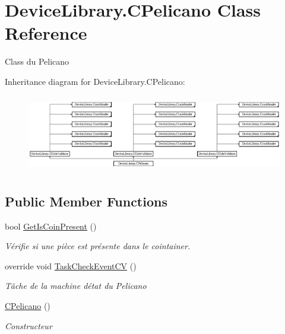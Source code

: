 \hypertarget{class_device_library_1_1_c_pelicano}{}\section{Device\+Library.\+C\+Pelicano Class Reference}
\label{class_device_library_1_1_c_pelicano}


Class du Pelicano  


Inheritance diagram for Device\+Library.\+C\+Pelicano\+:\begin{figure}[H]
\begin{center}
\leavevmode
\includegraphics[height=3.420593cm]{class_device_library_1_1_c_pelicano}
\end{center}
\end{figure}
\subsection*{Public Member Functions}
\begin{DoxyCompactItemize}
\item 
bool \mbox{\hyperlink{class_device_library_1_1_c_pelicano_a8858d106bae3622a44e9ba49f5a4b98a}{Get\+Is\+Coin\+Present}} ()
\begin{DoxyCompactList}\small\item\em Vérifie si une pièce est présente dans le cointainer. \end{DoxyCompactList}\item 
override void \mbox{\hyperlink{class_device_library_1_1_c_pelicano_a38a0d7a675ff22773f5eb153fab9275a}{Task\+Check\+Event\+CV}} ()
\begin{DoxyCompactList}\small\item\em Tâche de la machine d\textquotesingle{}état du Pelicano \end{DoxyCompactList}\item 
\mbox{\hyperlink{class_device_library_1_1_c_pelicano_aef2cd2553815e501b455b7304e3b80fe}{C\+Pelicano}} ()
\begin{DoxyCompactList}\small\item\em Constructeur \end{DoxyCompactList}\end{DoxyCompactItemize}
